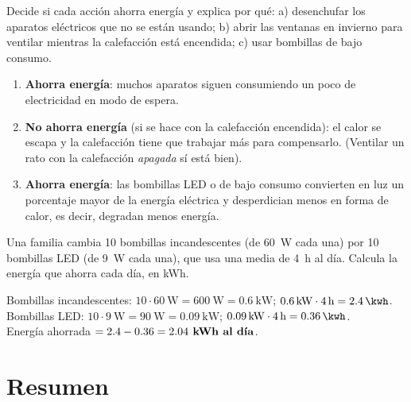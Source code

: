 \begin{exercise}
    Decide si cada acción ahorra energía y explica por qué: a) desenchufar los aparatos eléctricos que no se están usando; b) abrir las ventanas en invierno para ventilar mientras la calefacción está encendida; c) usar bombillas de bajo consumo.
    \begin{solu}
        \begin{enumerate}[label=\alph*)]
            \item \textbf{Ahorra energía}: muchos aparatos siguen consumiendo un poco de electricidad en modo de espera.
            \item \textbf{No ahorra energía} (si se hace con la calefacción encendida): el calor se escapa y la calefacción tiene que trabajar más para compensarlo. (Ventilar un rato con la calefacción \textit{apagada} sí está bien).
            \item \textbf{Ahorra energía}: las bombillas LED o de bajo consumo convierten en luz un porcentaje mayor de la energía eléctrica y desperdician menos en forma de calor, es decir, degradan menos energía.
        \end{enumerate}
    \end{solu}
\end{exercise}

\begin{exercise}
    Una familia cambia 10 bombillas incandescentes (de \qty{60}{\watt} cada una) por 10 bombillas LED (de \qty{9}{\watt} cada una), que usa una media de \qty{4}{\hour} al día. Calcula la energía que ahorra cada día, en kWh.
    \begin{solu}
        Bombillas incandescentes: \(10 \cdot \qty{60}{\watt} = \qty{600}{\watt} = \qty{0.6}{\kilo\watt}\); \(\qty{0.6}{\kilo\watt} \cdot \qty{4}{\hour} = \qty{2.4}{\kwh}\). \\
        Bombillas LED: \(10 \cdot \qty{9}{\watt} = \qty{90}{\watt} = \qty{0.09}{\kilo\watt}\); \(\qty{0.09}{\kilo\watt} \cdot \qty{4}{\hour} = \qty{0.36}{\kwh}\). \\
        Energía ahorrada \(= \num{2.4} - \num{0.36} = \textbf{\num{2.04} kWh al día}\).
    \end{solu}
\end{exercise}


\section*{Resumen}

